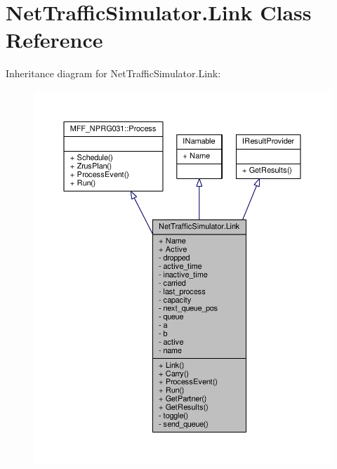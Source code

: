 \hypertarget{classNetTrafficSimulator_1_1Link}{\section{Net\-Traffic\-Simulator.\-Link Class Reference}
\label{classNetTrafficSimulator_1_1Link}
}


Inheritance diagram for Net\-Traffic\-Simulator.\-Link\-:
\nopagebreak
\begin{figure}[H]
\begin{center}
\leavevmode
\includegraphics[width=350pt]{classNetTrafficSimulator_1_1Link__inherit__graph}
\end{center}
\end{figure}


